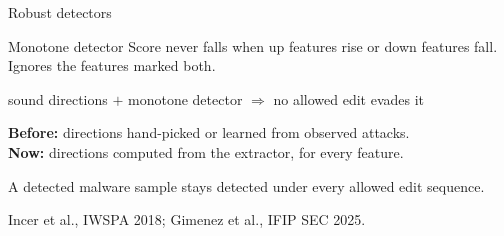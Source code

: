 \documentclass[aspectratio=169,11pt]{beamer}
\newcommand{\good}[1]{\textcolor{green!45!black}{#1}}
\begin{document}
\begin{frame}{Robust detectors}
  \begin{block}{Monotone detector}
    Score never falls when up features rise or down features fall.\\
    Ignores the features marked both.
  \end{block}
  \vfill
  \begin{center}
    \large sound directions $+$ monotone detector $\Rightarrow$ \good{no allowed edit evades it}
  \end{center}
  \vfill
  \textbf{Before:} directions hand-picked or learned from observed attacks.\\[0.4em]
  \textbf{Now:} directions \good{computed from the extractor}, for every feature.
  \vfill
  \begin{center}
    A detected malware sample stays detected under every allowed edit sequence.
  \end{center}
  {\footnotesize\color{gray} Incer et al., IWSPA 2018; Gimenez et al., IFIP SEC 2025.}
\end{frame}


\end{document}
